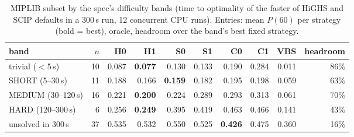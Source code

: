 \begin{table}[t]\centering\small
\begin{tabular}{lrrrrrrrrr}
\toprule
band & $n$ & H0 & H1 & S0 & S1 & C0 & C1 & VBS & headroom \\
\midrule
trivial ($<$5\,s) & 10 & 0.087 & \textbf{0.077} & 0.130 & 0.133 & 0.190 & 0.284 & 0.011 & 86\% \\
SHORT (5--30\,s) & 11 & 0.188 & 0.166 & \textbf{0.159} & 0.182 & 0.195 & 0.198 & 0.059 & 63\% \\
MEDIUM (30--120\,s) & 16 & 0.221 & \textbf{0.200} & 0.224 & 0.289 & 0.293 & 0.313 & 0.061 & 70\% \\
HARD (120--300\,s) & 6 & 0.256 & \textbf{0.249} & 0.395 & 0.419 & 0.463 & 0.466 & 0.141 & 43\% \\
unsolved in 300\,s & 37 & 0.535 & 0.532 & 0.550 & 0.525 & \textbf{0.426} & 0.475 & 0.360 & 16\% \\
\bottomrule
\end{tabular}
\caption{MIPLIB subset by the spec's difficulty bands (time to optimality of the faster of HiGHS and SCIP defaults in a 300\,s run, 12 concurrent CPU runs). Entries: mean $P(60)$ per strategy (bold = best), oracle, headroom over the band's best fixed strategy.}\label{tab:bands}
\end{table}